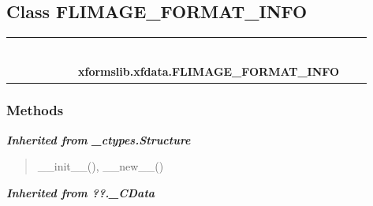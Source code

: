 
\subsection{Class FLIMAGE\_FORMAT\_INFO}

    \label{xformslib:xfdata:FLIMAGE_FORMAT_INFO}
\begin{tabular}{cccccccccc}
\multicolumn{2}{r}{\settowidth{\BCL}{object}\multirow{2}{\BCL}{object}}
&&
&&
&&
  \\\cline{3-3}
  &&\multicolumn{1}{c|}{}
&&
&&
&&
  \\
\multicolumn{4}{r}{\settowidth{\BCL}{??.\_CData}\multirow{2}{\BCL}{??.\_CData}}
&&
&&
  \\\cline{5-5}
  &&&&\multicolumn{1}{c|}{}
&&
&&
  \\
\multicolumn{6}{r}{\settowidth{\BCL}{\_ctypes.Structure}\multirow{2}{\BCL}{\_ctypes.Structure}}
&&
  \\\cline{7-7}
  &&&&&&\multicolumn{1}{c|}{}
&&
  \\
&&&&&&\multicolumn{2}{l}{\textbf{xformslib.xfdata.FLIMAGE\_FORMAT\_INFO}}
\end{tabular}



  \subsubsection{Methods}


\large{\textbf{\textit{Inherited from \_ctypes.Structure}}}

\begin{quote}
\_\_init\_\_(), \_\_new\_\_()
\end{quote}

\large{\textbf{\textit{Inherited from ??.\_CData}}}

